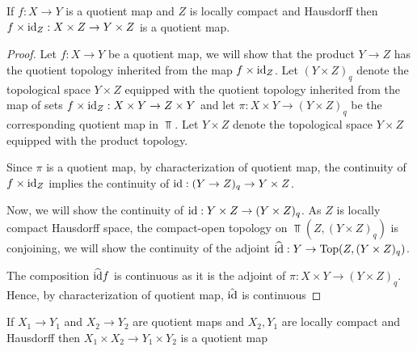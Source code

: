 \documentclass{article}
\begin{document}
\begin{lemma}
    If $f: X \to Y$ is a quotient map and $Z$ is locally compact and Hausdorff then $f \times \operatorname{id}_Z: X \times Z \to Y \times Z$ is a quotient map.
\end{lemma}

\begin{proof}
    Let $f: X \to Y$ be a quotient map, we will show that the product $Y \to Z$ has the quotient topology inherited from the map $f \times \operatorname{id}_Z$. Let $(Y \times Z)_q$ denote the topological space $Y \times Z$ equipped with the quotient topology inherited from the map of sets $f \times \operatorname{id}_Z: X \times Y \to Z \times Y$ and let $\pi: X \times Y \to (Y \times Z)_q$ be the corresponding quotient map in $\Top$. Let $Y \times Z$ denote the topological space $Y \times Z$ equipped with the product topology.

    Since $\pi$ is a quotient map, by characterization of quotient map, the continuity of $f \times \operatorname{id}_Z$ implies the continuity of $\operatorname{id}: (Y \to Z)_q \to Y \times Z$.
    \begin{center}
    \end{center}

    Now, we will show the continuity of $\operatorname{id}: Y \times Z \to (Y \times Z)_q$. As $Z$ is locally compact Hausdorff space, the compact-open topology on $\Top(Z, (Y \times Z)_q)$ is conjoining, we will show the continuity of the adjoint $\widehat{\operatorname{id}}: Y \to \operatorname{Top}(Z, (Y \times Z)_q)$.
    \begin{center}
    \end{center}

    The composition $\widehat{\operatorname{id}} f$ is continuous as it is the adjoint of $\pi: X \times Y \to (Y \times Z)_q$. Hence, by characterization of quotient map, $\hat{\operatorname{id}}$ is continuous
\end{proof}

\begin{theorem}
    If $X_1 \to Y_1$ and $X_2 \to Y_2$ are quotient maps and $X_2, Y_1$ are locally compact and Hausdorff then $X_1 \times X_2 \to Y_1 \times Y_2$ is a quotient map
\end{theorem}
\end{document}
